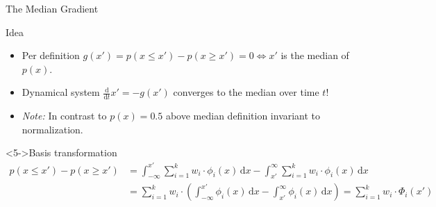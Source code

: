 \documentclass[aspectratio=169]{beamer}
\begin{document}
\begin{frame}{The Median Gradient}

\begin{block}{Idea}
\begin{itemize}
	\item<1-> Per definition $g(x') = p(x \leq x') - p(x \geq x') = 0 \Leftrightarrow x'$ is the median of $p(x)$.
	\item<2->[$\Rightarrow$] Dynamical system $\frac{\mathrm{d}}{\mathrm{d}t} x' = -g(x')$ converges to the median over time $t$!
	\item<3-> {\color{violet}\emph{Note:}} In contrast to $p(x) = 0.5$ above median definition invariant to normalization.
\end{itemize}
\end{block}

\begin{block}<5->{Basis transformation}
\begin{align*}
	p(x \leq x') - p(x \geq x')
		&= \int_{-\infty}^{x'} \sum_{i = 1}^k w_i \cdot \phi_i(x) \,\mathrm{d}x
			- \int_{x'}^{\infty}  \sum_{i = 1}^k w_i \cdot \phi_i(x) \,\mathrm{d}x\\ 
		&= \sum_{i = 1}^k w_i \cdot \left(
				\int_{-\infty}^{x'} \phi_i(x) \,\mathrm{d}x
			- \int_{x'}^{\infty}  \phi_i(x) \,\mathrm{d}x \right)
			= \sum_{i = 1}^k w_i \cdot \Phi_i(x')
\end{align*}
\end{block}

\end{frame}
\end{document}
